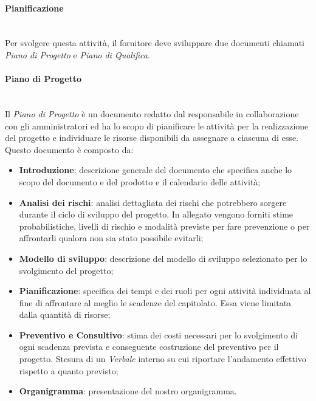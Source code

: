 \paragraph{Pianificazione}\mbox{}\\ [1mm]
Per svolgere questa attività, il fornitore deve sviluppare due documenti chiamati \textit{Piano di Progetto} e \textit{Piano di Qualifica}.
\paragraph{Piano di Progetto}\mbox{}\\ [1mm]
Il \textit{Piano di Progetto} è un documento redatto dal responsabile in collaborazione con gli amministratori ed ha lo scopo di pianificare le attività per la realizzazione del progetto e individuare le risorse disponibili da assegnare a ciascuna di esse.
Questo documento è composto da:
\begin{itemize}
	\item \textbf{Introduzione}: descrizione generale del documento che specifica anche lo scopo del documento e del prodotto e il calendario delle attività;
	\item \textbf{Analisi dei rischi}: analisi dettagliata dei rischi che potrebbero sorgere durante il ciclo di sviluppo del progetto\glo. In allegato vengono forniti stime probabilistiche, livelli di rischio e modalità previste per fare prevenzione o per affrontarli qualora non sia stato possibile evitarli;
	\item \textbf{Modello di sviluppo}: descrizione del modello di sviluppo selezionato per lo svolgimento del progetto\glo;
	\item \textbf{Pianificazione}: specifica dei tempi e dei ruoli per ogni attività individuata al fine di affrontare al meglio le scadenze del capitolato\glo. Essa viene limitata dalla quantità di risorse;
	\item \textbf{Preventivo e Consultivo}: stima dei costi necessari per lo svolgimento di ogni scadenza prevista e conseguente costruzione del preventivo per il progetto\glo. Stesura di un \textit{Verbale} interno su cui riportare l'andamento effettivo rispetto a quanto previsto;
	\item \textbf{Organigramma}: presentazione del nostro organigramma.
\end{itemize}
